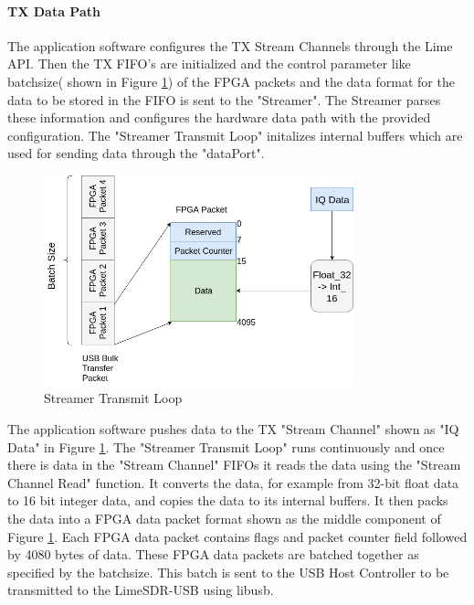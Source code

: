 \paragraph{TX Data Path} The application software configures the TX Stream Channels through the Lime \ac{API}. 
Then the TX FIFO's are initialized and the control parameter like batchsize( shown in Figure \ref{trans_loop}) of the \ac{FPGA} packets and the data format for the data to be stored in the FIFO is sent to the "Streamer".
The Streamer parses these information and configures the hardware data path with the provided configuration.
The "Streamer Transmit Loop" initalizes internal buffers which are used for sending data through the "dataPort".\\
\begin{figure}[h!]
\centering
\includegraphics[width=0.8\textwidth]{Figure/DriverHost.png}
\caption{Streamer Transmit Loop}
\label{trans_loop}
\end{figure}
 
The application software pushes data to the TX "Stream Channel" shown as "IQ Data" in Figure \ref{trans_loop}.
The "Streamer Transmit Loop" runs continuously and once there is data in the "Stream Channel" FIFOs it reads the data using the "Stream Channel Read" function.
It converts the data, for example from 32-bit float data to 16 bit integer data, and copies the data to its internal buffers.
It then packs the data into a FPGA data packet format shown as the middle component of Figure \ref{trans_loop}.
Each \ac{FPGA} data packet contains flags and packet counter field followed by  4080 bytes of data.
These \ac{FPGA} data packets are batched together as specified by the batchsize.
This batch is sent to the USB Host Controller to be transmitted to the LimeSDR-USB using libusb.

